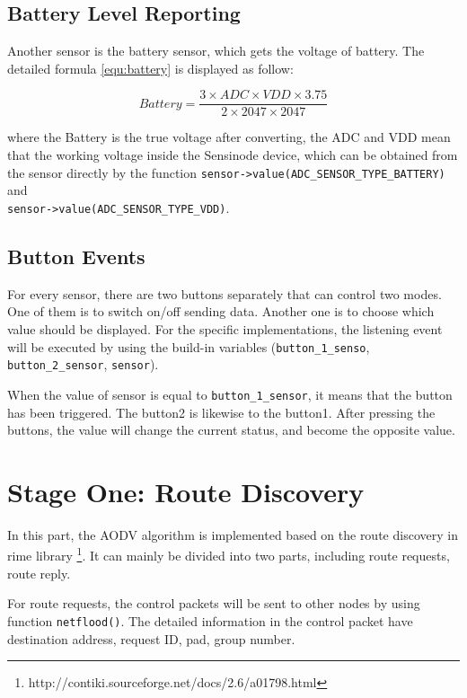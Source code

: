 \subsection{Battery Level Reporting}
Another sensor is the battery sensor, which gets the voltage of battery. The detailed formula \ref{equ:battery} is displayed as follow:

\begin{equation}
    Battery = 
    \frac{3 \times ADC \times VDD \times 3.75}{2 \times 2047 \times 2047}
\label{equ:battery}
\end{equation}

where the Battery is the true voltage after converting, the ADC and VDD mean that the working voltage inside the Sensinode device, which can be obtained from the sensor directly by the function \texttt{sensor->value(ADC\_SENSOR\_TYPE\_BATTERY)} and \\
\texttt{sensor->value(ADC\_SENSOR\_TYPE\_VDD)}.

\subsection{Button Events}
For every sensor, there are two buttons separately that can control two modes. One of them is to switch on/off sending data. Another one is to choose which value should be displayed. For the specific implementations, the listening event will be executed by using the build-in variables (\texttt{button\_1\_senso}, \texttt{button\_2\_sensor}, \texttt{sensor}). 

When the value of sensor is equal to \texttt{button\_1\_sensor}, it means that the button has been triggered. The button2 is likewise to the button1. After pressing the buttons, the value will change the current status, and become the opposite value. 

\section{Stage One: Route Discovery}

In this part, the AODV algorithm is implemented based on the route discovery in rime library \footnote{http://contiki.sourceforge.net/docs/2.6/a01798.html}. 
It can mainly be divided into two parts, including route requests, route reply.

For route requests, the control packets will be sent to other nodes by using function \texttt{netflood()}. The detailed information in the control packet have destination address, request ID, pad, group number.

